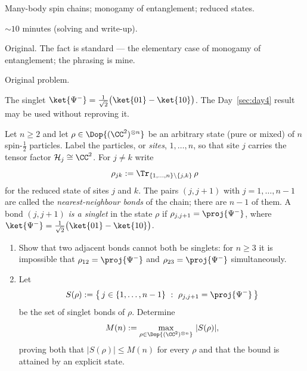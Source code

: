 
\begin{daymeta}
  \item[Topic] Many-body spin chains; monogamy of entanglement; reduced states.
  \item[Estimated time] $\sim 10$ minutes (solving and write-up).
  \item[Origin] Original. The fact is standard --- the elementary case of monogamy of
    entanglement; the phrasing is mine.
  \item[Source] Original problem.
  \item[Prerequisites] The singlet
    $\ket{\Psi^{-}}=\tfrac{1}{\sqrt{2}}\bigl(\ket{01}-\ket{10}\bigr)$.
    The Day~\ref{sec:day4} result may be used without reproving it.
\end{daymeta}

\begin{problem}
Let $n\ge 2$ and let $\rho\in\Dop{(\CC^{2})^{\otimes n}}$ be an arbitrary state (pure or
mixed) of $n$ spin-$\tfrac12$ particles. Label the particles, or \emph{sites},
$1,\dots,n$, so that site $j$ carries the tensor factor $\mathcal H_j\cong\CC^{2}$.
For $j\neq k$ write
\[
  \rho_{jk}:=\Tr_{\{1,\dots,n\}\setminus\{j,k\}}\,\rho
\]
for the reduced state of sites $j$ and $k$. The pairs $(j,j+1)$ with
$j=1,\dots,n-1$ are called the \emph{nearest-neighbour bonds} of the chain; there are
$n-1$ of them. A bond $(j,j+1)$ \emph{is a singlet} in the state $\rho$ if
$\rho_{j,j+1}=\proj{\Psi^{-}}$, where
$\ket{\Psi^{-}}=\tfrac{1}{\sqrt{2}}\bigl(\ket{01}-\ket{10}\bigr)$.

\begin{enumerate}[label=\textbf{(\alph*)},leftmargin=*]
  \item Show that two adjacent bonds cannot both be singlets: for $n\ge 3$ it is
        impossible that $\rho_{12}=\proj{\Psi^{-}}$ and $\rho_{23}=\proj{\Psi^{-}}$
        simultaneously.
  \item Let
        \[
          S(\rho):=\bigl\{\,j\in\{1,\dots,n-1\}\ :\ \rho_{j,j+1}=\proj{\Psi^{-}}\,\bigr\}
        \]
        be the set of singlet bonds of $\rho$. Determine
        \[
          M(n):=\max_{\rho\in\Dop{(\CC^{2})^{\otimes n}}}\ \lvert S(\rho)\rvert ,
        \]
        proving both that $\lvert S(\rho)\rvert\le M(n)$ for every $\rho$ and that the
        bound is attained by an explicit state.
\end{enumerate}
\end{problem}

